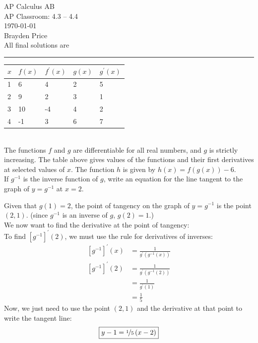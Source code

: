 \documentclass[12pt,letterpaper, onecolumn]{exam}
\begin{document}
	
	\begingroup  
	\centering
	\LARGE AP Calculus AB\\
	\LARGE AP Classroom: 4.3 -- 4.4\\[0.5em]
	\large \today\\[0.5em]
	\large Brayden Price \\
	All final solutions are  \\
	\endgroup
	\rule{\textwidth}{0.4pt}
	
	\listofexercises
	\clearpage
	
	\printanswers
	\renewcommand{\solutiontitle}{\noindent\textbf{Solution:}\enspace}   %
	
	\begin{questions}
		
		\question
			\begin{tabular}{l||l|l|l|l}
			 $x$ &  $f(x)$ &  $f^{\prime}(x)$ &  $g(x)$ & $g^{\prime}(x)$ \\ \hline \hline
			 1 &  6    &  4     &  2    & 5     \\
			 2 &  9    &  2     &  3    & 1     \\
			 3 &  10   &  -4    &  4    & 2     \\
			 4 &  -1   &  3     &  6    & 7    
			\end{tabular} \\
			The functions $f$ and $g$ are differentiable for all real numbers, and $g$ is strictly increasing. The table above gives values of the functions and their first derivatives at selected values of $x$. The function $h$ is given by $h(x) = f(g(x)) - 6$. \\
			If $g^{-1}$ is the inverse function of $g$, write an equation for the line tangent to the graph of $y = g^{-1}$ at $x=2$.
		
			\begin{solution}
				Given that $g(1) = 2$, the point of tangency on the graph of $y = g^{-1}$ is the point $(2,1)$. {\footnotesize (since $g^{-1}$ is an inverse of $g$, $g(2)=1$.)} \\
				We now want to find the derivative at the point of tangency: \\ 
				To find $\left[ g^{-1} \right] ^ {\prime} \left( 2 \right)$, we must use the rule for derivatives of inverses:
				\begin{align*}
					\left[ g^{-1} \right] ^ {\prime} \left( x \right) &= \frac { 1 } { g^{\prime} \left( g^{-1} \left( x \right)  \right) } \\
					\left[ g^{-1} \right] ^ {\prime} \left( 2 \right) &= \frac { 1 } { g^{\prime} \left( g^{-1} \left( 2 \right)  \right) } \\
																	  &= \frac { 1 } { g^{\prime} \left( 1 \right) } \\
																	  &= \frac { 1 } { 5 }
				\end{align*}
				Now, we just need to use the point $(2,1)$ and the derivative at that point to write the tangent line: \\
				$$ \boxed{y-1 = \nicefrac{1}{5} \left( x-2 \right)} $$
			\end{solution}
		

\end{questions}
\end{document}

